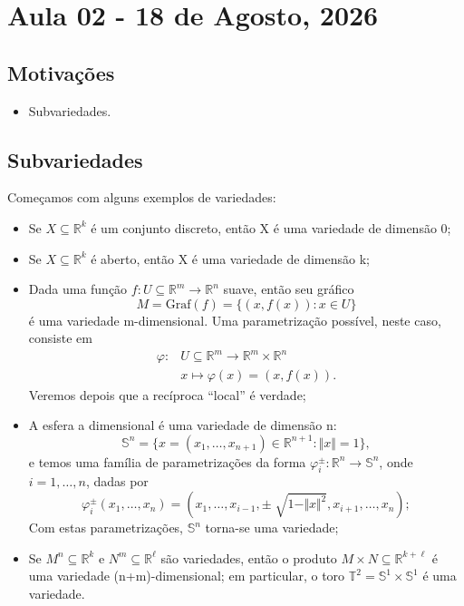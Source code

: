 \documentclass[../differential_topology.tex]{subfiles}
\begin{document}
\section{Aula 02 - 18 de Agosto, 2026}
\subsection{Motivações}
\begin{itemize}
	\item Subvariedades.
\end{itemize}
\subsection{Subvariedades}
Começamos com alguns exemplos de variedades:
\begin{example}
	\begin{itemize}
		\item[1)] Se \(X\subseteq \mathbb{R}^{k}\) é um conjunto discreto, então X é uma variedade de dimensão 0;
		\item[2)] Se \(X\subseteq \mathbb{R}^{k}\) é aberto, então X é uma variedade de dimensão k;
		\item[3)] Dada uma função \(f:U\subseteq \mathbb{R}^{m}\rightarrow \mathbb{R}^{n}\) suave, então seu gráfico
		      \[
			      M = \mathrm{Graf}(f) = \{(x, f(x)):x\in U\}
		      \]
		      é uma variedade m-dimensional. Uma parametrização possível, neste caso, consiste em
		      \begin{align*}
			      \varphi : & U\subseteq \mathbb{R}^{m}\rightarrow \mathbb{R}^{m}\times \mathbb{R}^{n} \\
			                & x\longmapsto \varphi (x)=(x, f(x)).
		      \end{align*}
		      Veremos depois que a recíproca ``local'' é verdade;
		\item[4)] A esfera a dimensional é uma variedade de dimensão n:
		      \[
			      \mathbb{S}^{n}=\{x=(x_1, \dotsc , x_{n+1})\in \mathbb{R}^{n+1}: \Vert x \Vert=1\},
		      \]
		      e temos uma família de parametrizações da forma \(\varphi_{i}^{\pm}:\mathbb{R}^{n}\rightarrow \mathbb{S}^{n}\), onde \(i=1, \dotsc , n\), dadas por
		      \[
			      \varphi_{i}^{\pm}(x_1, \dotsc , x_{n}) = (x_1, \dotsc , x_{i-1}, \pm \sqrt[]{1-\Vert x \Vert^{2}}, x_{i+1}, \dotsc , x_{n});
		      \]
		      Com estas parametrizações, \(\mathbb{S}^{n}\) torna-se uma variedade;
		\item[5)] Se \(M^{n}\subseteq \mathbb{R}^{k}\) e \(N^{m}\subseteq \mathbb{R}^{\ell }\) são variedades, então o produto \(M\times N\subseteq \mathbb{R}^{k+\ell }\) é uma variedade (n+m)-dimensional; em particular, o toro \(\mathbb{T}^{2} = \mathbb{S}^{1}\times \mathbb{S}^{1}\) é uma variedade.

\end{itemize}
\end{example}
\end{document}
